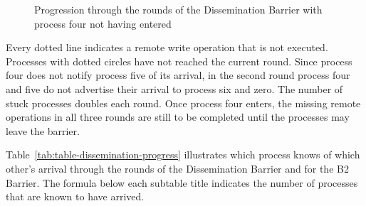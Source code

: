 \documentclass[a4paper, 10pt]{article}
\begin{document}
\begin{figure}[htbp]
	\centering
	
	\caption{Progression through the rounds of the Dissemination Barrier with process four not having entered}
	\label{fig:diagram-dissemination-progress}
\end{figure}

Every dotted line indicates a remote write operation that is not executed. Processes with dotted circles have not reached the current round.
Since process four does not notify process five of its arrival, in the second round process four and five do not advertise their arrival to process six and zero. The number of stuck processes doubles each round.
Once process four enters, the missing remote operations in all three rounds are still to be completed until the processes may leave the barrier.

Table~\ref{tab:table-dissemination-progress} illustrates which process knows of which other's arrival through the rounds of the Dissemination Barrier and for the B2 Barrier. The formula below each subtable title indicates the number of processes that are known to have arrived.
\end{document}
